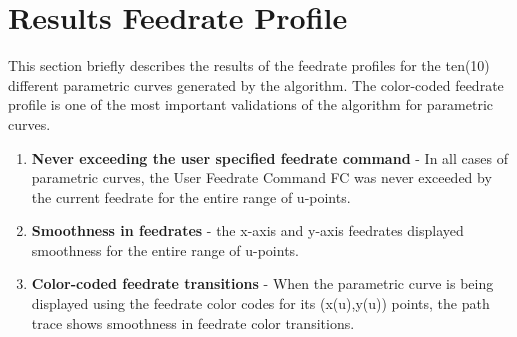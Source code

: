
\section{Results Feedrate Profile}

This section briefly describes the results of the feedrate profiles for the ten(10) different parametric curves generated by the algorithm. The color-coded feedrate profile is one of the most important validations of the algorithm for parametric curves.

\begin{enumerate}
	\item \textbf{Never exceeding the user specified feedrate command} - In all cases of parametric curves, the User Feedrate Command FC was never exceeded by the current feedrate for the entire range of u-points.
	
	\item \textbf{Smoothness in feedrates} - the x-axis and y-axis feedrates displayed smoothness for the entire range of u-points.
	
	\item \textbf{Color-coded feedrate transitions} - When the parametric curve is being displayed using the feedrate color codes for its (x(u),y(u)) points, the path trace shows smoothness in feedrate color transitions.

\end{enumerate}

